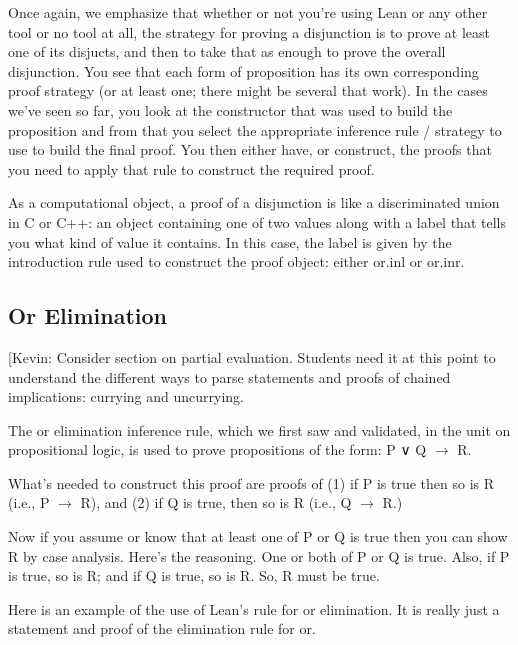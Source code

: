 \documentclass[letterpaper,10pt,english]{sphinxmanual}
\begin{document}
Once again, we emphasize that whether or not you’re using Lean or any
other tool or no tool at all, the strategy for proving a disjunction
is to prove at least one of its disjucts, and then to take that as
enough to prove the overall disjunction. You see that each form of
proposition has its own corresponding proof strategy (or at least one;
there might be several that work). In the cases we’ve seen so far, you
look at the constructor that was used to build the proposition and
from that you select the appropriate inference rule / strategy to use
to build the final proof. You then either have, or construct, the
proofs that you need to apply that rule to construct the required
proof.

As a computational object, a proof of a disjunction is like a
discriminated union in C or C++: an object containing one of two
values along with a label that tells you what kind of value it
contains. In this case, the label is given by the introduction rule
used to construct the proof object: either or.inl or or.inr.


\subsection{Or Elimination}
\label{\detokenize{15-proofs:or-elimination}}
{[}Kevin: Consider section on partial evaluation. Students need it at
this point to understand the different ways to parse statements and
proofs of chained implications: currying and uncurrying.

The or elimination inference rule, which we first saw and validated,
in the unit on propositional logic, is used to prove propositions of
the form: P ∨ Q \(\rightarrow\) R.

What’s needed to construct this proof are proofs of (1) if P is true
then so is R (i.e., P \(\rightarrow\) R), and (2) if Q is true, then so is R (i.e.,
Q \(\rightarrow\) R.)

Now if you assume or know that at least one of P or Q is true then you
can show R by case analysis. Here’s the reasoning. One or both of P or
Q is true. Also, if P is true, so is R; and if Q is true, so is R. So,
R must be true.

Here is an example of the use of Lean’s rule for or elimination. It is
really just a statement and proof of the elimination rule for or.
\end{document}
